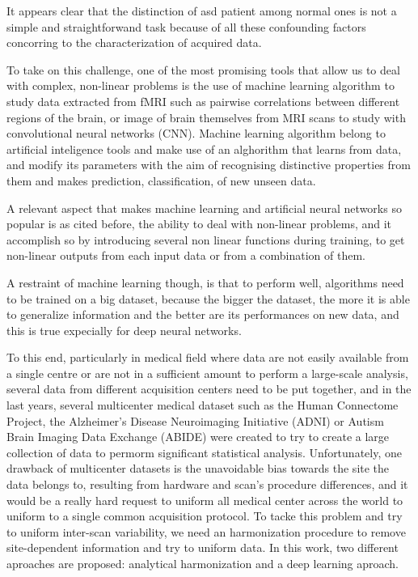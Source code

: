 \documentclass[a4paper,11pt]{article}
\begin{document}
It appears clear that the distinction of asd patient among normal ones is not a simple and straightforwand task because of all these confounding factors concorring to the characterization of acquired data.

To take on this challenge, one of the most promising tools that allow us to deal with complex, non-linear problems is the use of machine learning algorithm to study data extracted from fMRI such as pairwise correlations between different regions of the brain, or image of brain themselves from MRI scans to study with convolutional neural networks (CNN).
Machine learning algorithm belong to artificial inteligence tools and make use of an alghorithm that learns from data, and modify its parameters with the aim of recognising distinctive properties from them and makes prediction, classification, of new unseen data.

A relevant aspect that makes machine learning and artificial neural networks so popular is as cited before, the ability to deal with non-linear problems, and it accomplish so by introducing several non linear functions during training, to get non-linear outputs from each input data or from a combination of them.

A restraint of machine learning though, is that to perform well, algorithms need to be trained on a big dataset, because the bigger the dataset, the more it is able to generalize information and the better are its performances on new data, and this is true expecially for deep neural networks.

To this end, particularly in medical field where data are not easily available from a single centre or are not in a sufficient amount to perform a large-scale analysis, several data from different acquisition centers need to be put together, and in the last years, several multicenter medical dataset such as the Human Connectome Project, the Alzheimer’s Disease Neuroimaging Initiative (ADNI) or Autism Brain Imaging Data Exchange (ABIDE) were created to try to create a large collection of data to permorm significant statistical analysis.
Unfortunately, one drawback of multicenter datasets is the unavoidable bias towards the site the data belongs to, resulting from hardware and scan's procedure differences, and it would be a really hard request to uniform all medical center across the world to uniform to a single common acquisition protocol.
To tacke this problem and try to uniform inter-scan variability, we need an harmonization procedure to remove site-dependent information and try to uniform data.
In this work, two different aproaches are proposed: analytical harmonization and a deep learning aproach.
\end{document}
